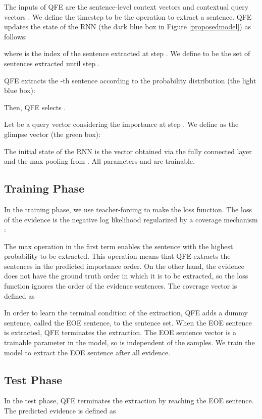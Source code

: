 \documentclass[11pt,a4paper]{article}
\theoremstyle{definition}
\begin{document}
	The inputs of QFE are the sentence-level context vectors 
	and contextual query vectors .
    We define the timestep to be the operation to extract a sentence. QFE updates the state of the RNN (the dark blue box in Figure \ref{proposedmodel}) as follows:
	
	where  is the index of the sentence extracted at step .
	We define   to be the set of sentences extracted until step .
	
	QFE extracts the -th sentence according to the probability distribution (the light blue box):
	
	
	Then, QFE selects .
	
	Let  be a query vector considering the importance at step .
	We define  as the glimpse vector \cite{glimpse} (the green box):
	

	The initial state of the RNN is the vector obtained via the fully connected layer and the max pooling from . 
	All parameters  and  are trainable.
	
	\subsection{Training Phase}
	\label{ssec:learning}
	In the training phase, we use teacher-forcing to make the loss function.
	The loss of the evidence  is the negative log likelihood 
	regularized by a coverage mechanism \cite{pointer}:
	
	The max operation in the first term enables the sentence with the highest probability to be extracted.
	This operation means that QFE extracts the sentences in the predicted importance order.
	On the other hand, the evidence does not have the ground truth order in which it is to be extracted, so the loss function ignores the order of the evidence sentences.
	The coverage vector  is defined as
	
	
	In order to learn the terminal condition of the extraction, QFE adds a dummy sentence, called the EOE sentence, to the sentence set. When the EOE sentence is extracted, QFE terminates the extraction. The EOE sentence vector  is a trainable parameter in the model, so  is independent of the samples. We train the model to extract the EOE sentence after all evidence.
	
	\subsection{Test Phase}
	\label{ssec:test}
	In the test phase, QFE terminates the extraction by reaching the EOE sentence. 
	The predicted evidence is defined as
	
\end{document}
